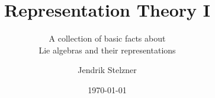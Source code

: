 \documentclass[a4paper,10pt,twoside=semi,openany]{scrbook}
\title{Representation Theory I}
\subtitle{A collection of basic facts about \\ Lie algebras and their representations}
\author{Jendrik Stelzner}
\date{\today}
\begin{document}
\frontmatter
\maketitle

\tableofcontents

\mainmatter



\appendix
\addappheadtotoc
\appendixpage


\backmatter


\end{document}
